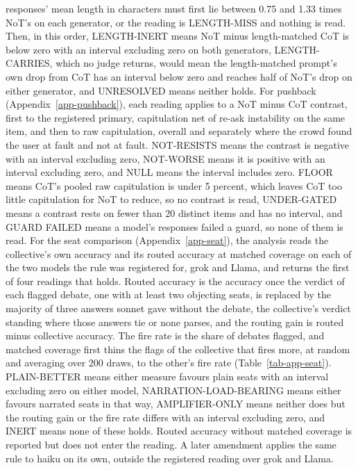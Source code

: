 responses' mean length in characters must first lie between 0.75 and 1.33
times NoT's on each generator, or the reading is LENGTH-MISS and nothing is
read. Then, in this order, LENGTH-INERT means NoT minus length-matched CoT is
below zero with an interval excluding zero on both generators, LENGTH-CARRIES,
which no judge returns, would mean the length-matched prompt's own drop from
CoT has an interval below zero and reaches half of NoT's drop on either
generator, and UNRESOLVED means neither holds.
For pushback (Appendix~\ref{app-pushback}), each reading applies to a NoT
minus CoT contrast, first to the registered primary, capitulation net of
re-ask instability on the same item, and then to raw capitulation, overall
and separately where the crowd found the user at fault and not at fault.
NOT-RESISTS means the contrast is negative with an interval excluding zero,
NOT-WORSE means it is positive with an interval excluding zero, and NULL means
the interval includes zero. FLOOR means CoT's pooled raw capitulation is under
5 percent, which leaves CoT too little capitulation for NoT to reduce, so no
contrast is read, UNDER-GATED means a contrast rests on fewer than 20 distinct
items and has no interval, and GUARD FAILED means a model's responses failed a
guard, so none of them is read.
For the seat comparison (Appendix~\ref{app-seat}), the analysis reads the
collective's own accuracy and its routed accuracy at matched coverage on
each of the two models the rule was registered for, grok and Llama, and
returns the first of four readings that holds. Routed accuracy is the
accuracy once the verdict of each flagged debate, one with at least two
objecting seats, is replaced by the majority of three answers sonnet gave
without the debate, the collective's verdict standing where those answers tie
or none parses, and the routing gain is routed minus collective accuracy. The fire rate is the share of
debates flagged, and matched coverage first thins the flags of the
collective that fires more, at random and averaging over 200 draws, to the
other's fire rate (Table~\ref{tab-app-seat}).
PLAIN-BETTER means either
measure favours plain seats with an interval excluding zero on either
model, NARRATION-LOAD-BEARING means either favours narrated seats in that
way, AMPLIFIER-ONLY means neither does but the routing gain or the fire rate
differs with an interval excluding zero, and INERT means none of these
holds. Routed accuracy without matched coverage is reported but does not
enter the reading. A later amendment applies the same rule to haiku on its
own, outside the registered reading over grok and Llama.
